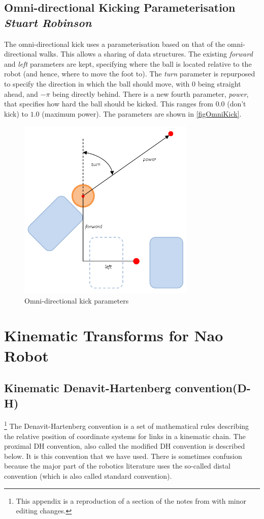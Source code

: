 \documentclass[pdftex,11pt,a4paper]{report}
\begin{document}
\section{Omni-directional Kicking Parameterisation\\
\emph{{\normalsize Stuart Robinson}}}
\label{sectionOminDirectionalKickingParameterisation} 
The omni-directional kick uses a parameterisation based on that of the
omni-directional walks. This allows a sharing of data structures. The
existing \emph{forward} and \emph{left} parameters are kept, specifying
where the ball is located relative to the robot (and hence, where to move
the foot to). The \emph{turn} parameter is repurposed to specify the
direction in which the ball should move, with 0 being straight ahead, and
$-\pi$ being directly behind. There is a new fourth parameter,
\emph{power}, that specifies how hard the ball should be kicked. This
ranges from $0.0$ (don't kick) to $1.0$ (maximum power). The parameters are
shown in \autoref{figOmniKick}.

\begin{figure} [ht]
\centering
\includegraphics[width=0.75\textwidth]{figures/omnikick_param}
\caption{Omni-directional kick parameters} \label{figOmniKick}
\end{figure}

\chapter{Kinematic Transforms for Nao Robot} \label{appendixMDH}
\section{Kinematic Denavit-Hartenberg convention(D-H)}
\footnote{This appendix is a reproduction of a section of the notes from \cite{rueppXXrecapitulation} with minor editing changes.} The Denavit-Hartenberg convention is a set of mathematical rules describing the relative position of coordinate systems for links in a kinematic chain. The proximal DH convention, also called the modified DH convention is described below. It is this convention that we have used. There is sometimes confusion because the major part of the robotics literature uses the so-called distal convention (which is also called standard convention).
\end{document}
